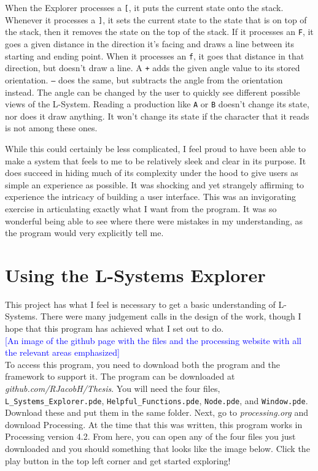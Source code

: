 \documentclass[12pt,twoside]{reedthesis}
\newcommand{\code}[1]{\texttt{#1}}
\begin{document}
	When the Explorer processes a \code{[}, it puts the current state onto the stack. Whenever it processes a \code{]}, it sets the current state to the state that is on top of the stack, then it removes the state on the top of the stack. If it processes an \code{F}, it goes a given distance in the direction it's facing and draws a line between its starting and ending point. When it processes an \code{f}, it goes that distance in that direction, but doesn't draw a line. A \code{+} adds the given angle value to its stored orientation. \code{–} does the same, but subtracts the angle from the orientation instead. The angle can be changed by the user to quickly see different possible views of the L-System. Reading a production like \code{A} or \code{B} doesn't change its state, nor does it draw anything. It won't change its state if the character that it reads is not among these ones.
	
	While this could certainly be less complicated, I feel proud to have been able to make a system that feels to me to be relatively sleek and clear in its purpose. It does succeed in hiding much of its complexity under the hood to give users as simple an experience as possible. It was shocking and yet strangely affirming to experience the intricacy of building a user interface. This was an invigorating exercise in articulating exactly what I want from the program. It was so wonderful being able to see where there were mistakes in my understanding, as the program would very explicitly tell me.

\section{Using the L-Systems Explorer}
\label{Using-the-L-Systems-Explorer}

	This project has what I feel is necessary to get a basic understanding of L-Systems. There were many judgement calls in the design of the work, though I hope that this program has achieved what I set out to do.\\
	
	\textcolor{blue}{[An image of the github page with the files and the processing website with all the relevant areas emphasized]}\\
	
	To access this program, you need to download both the program and the framework to support it. The program can be downloaded at \textit{github.com/RJacobH/Thesis}. You will need the four files, \code{L\_Systems\_Explorer.pde}, \code{Helpful\_Functions.pde}, \code{Node.pde}, and \code{Window.pde}. Download these and put them in the same folder. Next, go to \textit{processing.org} and download Processing. At the time that this was written, this program works in Processing version 4.2. From here, you can open any of the four files you just downloaded and you should something that looks like the image below. Click the play button in the top left corner and get started exploring!\\
	
\end{document}

